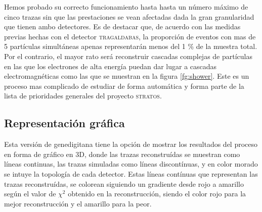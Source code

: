\documentclass[a4paper]{article}
\begin{document}
Hemos probado su correcto funcionamiento hasta hasta un número máximo de cinco trazas sin que las prestaciones se vean afectadas dada la gran granularidad que tienen ambo detectores. Es de destacar que, de acuerdo con las medidas previas hechas con el detector \textsc{tragaldabas}, la proporción de eventos con mas de 5 partículas simultáneas apenas representarán menos del 1 \% de la muestra total.  Por el contrario, el mayor rato será reconstruir cascadas complejas de partículas en las que los electrones de alta energía puedan dar lugar a cascadas electromagnéticas  como las que se muestran en la figura \ref{fg:shower}. Este es un proceso mas complicado de estudiar de forma automática y forma parte de la lista de prioridades generales del proyecto \textsc{stratos}.


\subsection{Representación gráfica}

Esta versión de genedigitana tiene la opción de mostrar los resultados del proceso en forma de gráfico en 3D, donde las trazas reconstruídas se muestran como líneas continuas, las trazas simuladas como líneas discontínuas, y en color morado se intuye la topología de cada detector. Estas líneas contínuas que representan las trazas reconstruídas, se colorean siguiendo un gradiente desde rojo a amarillo según el valor de $\chi^2$ obtenido en la reconstrucción, siendo el color rojo para la mejor reconstrucción y el amarillo para la peor.
\end{document}
